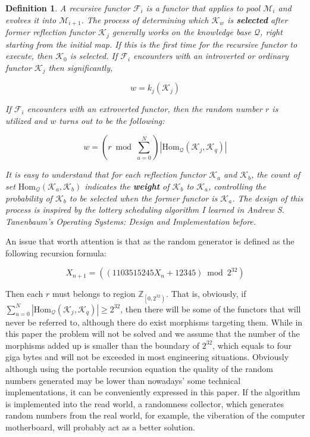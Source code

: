 \documentclass{article}
\newtheorem{definition}{Definition}
\begin{document}
\begin{definition}
	A recursive functor \(\mathcal{F}_i\) is a functor that applies to pool \(\mathcal{M}_i\) and evolves it into \(\mathcal{M}_{i+1}\). The process of determining which \(\mathcal{K}_w\) is \textbf{ selected} after former reflection functor \(\mathcal{K}_j\) generally works on the knowledge base \(\mathcal{Q}\), right starting from the initial map. If this is the first time for the recursive functor to execute, then \(\mathcal{K}_0\) is selected. If \(\mathcal{F}_i\) encounters with an introverted or ordinary functor \(\mathcal{K}_j\) then significantly,
	
	\[w = k_j\left(\mathcal{K}_j\right)\]
	
	If \(\mathcal{F}_i\) encounters with an extroverted functor, then the random number \(\mathit{r}\) is utilized and \(w\) turns out to be the following:
	
	\[w = (\mathit{r} \bmod \sum _{u=0}^N )\left|\text{Hom}_{\mathcal{Q}}\left(\mathcal{K}_j,\mathcal{K}_q\right)\right|\]
	
	It is easy to understand that for each reflection functor \(\mathcal{K}_a\) and \(\mathcal{K}_b\), the count of set \(\text{Hom}_{\mathcal{Q}}\left(\mathcal{K}_a,\mathcal{K}_b\right)\) indicates the \textbf{ weight} of \(\mathcal{K}_b\) to \(\mathcal{K}_a\), controlling the probability of \(\mathcal{K}_b\) to be selected when the former functor is \(\mathcal{K}_a\). The design of this process is inspired by the lottery scheduling algorithm I learned in Andrew S. Tanenbaum{'}s Operating Systems: Design and Implementation \cite{6} before.
\end{definition}

An issue that worth attention is that as the random generator is defined as the following recursion formula: \cite{5}

\[X_{n+1}=(\left(1103515245 X_n+12345\right) \bmod 2^{32})\]

Then each \(\mathit{r}\) must belongs to region \(\mathbb{Z}_{\left.\left[0,2^{32}\right.\right)}\). That is, obviously, if \(\sum _{u=0}^N \left|\text{Hom}_{\mathcal{Q}}\left(\mathcal{K}_j,\mathcal{K}_q\right)\right|\geq 2^{32}\), then there will be some of the functors that will never be referred to, although there do exist morphisms targeting them. While in this paper the problem will not be solved and we assume that the number of the morphisms added up is smaller than the boundary of \(2^{32}\), which equals to four giga bytes and will not be exceeded in most engineering situations. Obviously although using the portable recursion equation the quality of the random numbers generated may be lower than nowadays{'} some technical implementations, it can be conveniently expressed in this paper. If the algorithm is implemented into the read world, a randomness collector, which generates random numbers from the real world, for example, the viberation of the computer motherboard, will probably act as a better solution.
\end{document}

